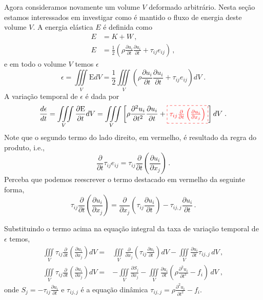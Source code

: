 Agora consideramos novamente um volume $V$ deformado arbitr\'ario. Nesta
se\c{c}\~ao estamos interessados em investigar como \'e mantido o
fluxo de energia deste volume $V$. A energia el\'astica $E$ \'e
definida como
\begin{align}
  E &= K + W \, ,\\
  E &= \frac{1}{2}\left(\rho\frac{\partial u_i}{\partial t}\frac{\partial u_i}{\partial t} +
  \tau_{ij}e_{ij} \right)\, ,
\end{align}
e em todo o volume $V$ temos $\epsilon$
\begin{equation}
\epsilon=\iiint\limits_{V}\mbox{E}dV=\frac{1}{2}\iiint\limits_{V}\left(
\rho\frac{\partial u_{i}}{\partial t}\frac{\partial u_{i}}{\partial t}+\tau_{ij}e_{ij}\right)dV \;.
\end{equation}
A varia\c{c}\~ao temporal de $\epsilon$ \'e dada por
\begin{equation}
\frac{d\epsilon}{dt}=\iiint\limits_{V}\frac{\partial \mbox{E}}{\partial t}dV=
\iiint\limits_{V} \left[\rho\frac{\partial^{2}
  u_{i}}{\partial t^{2}} \frac{\partial u_{i}}{\partial t}+\mathboxed{\tau_{ij}
\frac{\partial}{\partial t}\left(\frac{\partial u_{i}}{\partial
  x_{j}}\right)}\right]dV \;.
\end{equation}
Note que o segundo termo do lado direito, em vermelho, \'e resultado da regra do
produto, i.e.,
\begin{equation}
  \frac{\partial}{\partial t}\tau_{ij}e_{ij} = \tau_{ij} 
  \frac{\partial}{\partial t}\left(\frac{\partial u_{i}}{\partial x_{j}}\right)
  \, .
\end{equation}
Perceba que podemos reescrever o termo destacado em vermelho da seguinte forma,
\begin{equation}
  \tau_{ij}\frac{\partial}{\partial t}
  \left(\frac{\partial u_{i}}{\partial x_{j}}\right) = 
  \frac{\partial}{\partial x_j}\left(\tau_{ij}\frac{\partial u_i}{\partial t}\right)-
  \tau_{ij,j}\frac{\partial u_i}{\partial t} \, .
\end{equation}

Substituindo o termo acima na equa\c{c}\~ao integral da taxa de varia\c{c}\~ao
temporal de $\epsilon$ temos,
\begin{align}
\iiint\limits_{V}\tau_{ij}
\frac{\partial}{\partial t}\left(\frac{\partial u_{i}}{\partial
x_{j}}\right)dV=
&\iiint\limits_{V}
\frac{\partial}{\partial x_{j}}\left(\tau_{ij}\frac{\partial
u_{i}}{\partial t}\right)dV- \iiint\limits_{V}
\frac{\partial u_{i}}{\partial t} \tau_{ij,j}\,dV \, ,\\
\iiint\limits_{V}\tau_{ij}
\frac{\partial}{\partial t}\left(\frac{\partial u_{i}}{\partial
x_{j}}\right)dV =&-\iiint\limits_{V}\frac{\partial S_{j}}{\partial x_{j}}-
\iiint\limits_{V}\frac{\partial u_{i}}{\partial
t}\left(\rho\frac{\partial^{2} u_{i}}{\partial
t^{2}}-f_{i}\right)\,dV \;,
\end{align}
onde $S_{j}=-\tau_{ij}\frac{\partial
u_{i}}{\partial t}$ e $\tau_{ij,j}$ \'e a equa\c{c}\~ao din\^amica $\tau_{ij,j}=\rho
\frac{\partial^{2} u_{i}}{\partial t^{2}}-f_{i}$.

